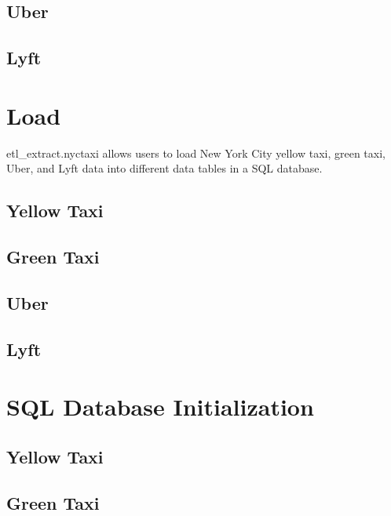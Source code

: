 \documentclass[12pt,twoside]{reedthesis}
\theoremstyle{definition}
\theoremstyle{definition}
\theoremstyle{definition}
\theoremstyle{remark}
\begin{document}
\subsection{Uber}\label{uber-4}

\subsection{Lyft}\label{lyft-4}

\section{Load}\label{load}

etl\_extract.nyctaxi allows users to load New York City yellow taxi,
green taxi, Uber, and Lyft data into different data tables in a SQL
database.

\subsection{Yellow Taxi}\label{yellow-taxi-5}

\subsection{Green Taxi}\label{green-taxi-5}

\subsection{Uber}\label{uber-5}

\subsection{Lyft}\label{lyft-5}

\section{SQL Database Initialization}\label{sql-database-initialization}

\subsection{Yellow Taxi}\label{yellow-taxi-6}

\subsection{Green Taxi}\label{green-taxi-6}
\end{document}
